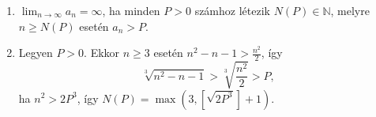 \documentclass[11pt]{scrartcl}
\begin{document}
\begin{enumerate}
	\item $\lim_{n \to \infty} a_n = \infty$, ha minden $P > 0$ számhoz
	      létezik $N(P) \in \mathbb{N}$, melyre $n \ge N(P)$ esetén $a_n > P$.

	\item Legyen $P > 0$. Ekkor $n \ge 3$ esetén $n^2 - n - 1 > \frac{n^2}{2}$,
	      így
	      \[
		      \sqrt[3]{n^2 - n - 1} > \sqrt[3]{\frac{n^2}{2}} > P,
	      \]
	      ha $n^2 > 2P^3$, így
	      \(
	      N(P) = \max\left(3, \left[\sqrt{2P^3}\right] + 1\right)
	      \).
\end{enumerate}
\end{document}
